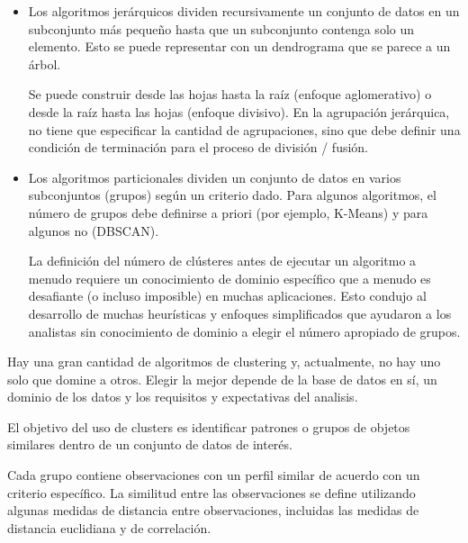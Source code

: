 \documentclass[12pt, fleqn]{report}                             %
\theoremstyle{break}                                            %
\begin{document}
        \begin{itemize}
            \item Los algoritmos jerárquicos dividen recursivamente un conjunto de datos en 
            un subconjunto más pequeño hasta que un subconjunto contenga solo un elemento. 
            Esto se puede representar con un dendrograma que se parece a un árbol. 
            
            Se puede construir desde las hojas hasta la raíz (enfoque aglomerativo) o desde la raíz hasta las hojas 
            (enfoque divisivo). En la agrupación jerárquica, no tiene que especificar la cantidad de agrupaciones, 
            sino que debe definir una condición de terminación para el proceso de división / fusión.

            \item Los algoritmos particionales dividen un conjunto de datos en varios subconjuntos 
            (grupos) según un criterio dado. 
            Para algunos algoritmos, el número de grupos debe definirse a priori (por ejemplo, K-Means) y 
            para algunos no (DBSCAN). 
            
            La definición del número de clústeres antes de ejecutar un algoritmo a menudo requiere un conocimiento
            de dominio específico que a menudo es desafiante (o incluso imposible) en muchas aplicaciones. 
            Esto condujo al desarrollo de muchas heurísticas y enfoques simplificados que ayudaron a los 
            analistas sin conocimiento de dominio a elegir el número apropiado de grupos.
        \end{itemize}

        Hay una gran cantidad de algoritmos de clustering y, actualmente, no hay uno solo que domine 
        a otros. 
        Elegir la mejor depende de la base de datos en sí, un dominio de los datos y los requisitos 
        y expectativas del analisis.

        El objetivo del uso de clusters es identificar patrones o grupos de objetos similares dentro de un 
        conjunto de datos de interés.

        Cada grupo contiene observaciones con un perfil similar de acuerdo con un criterio específico. 
        La similitud entre las observaciones se define utilizando algunas medidas de distancia entre observaciones, 
        incluidas las medidas de distancia euclidiana y de correlación.
\end{document}
